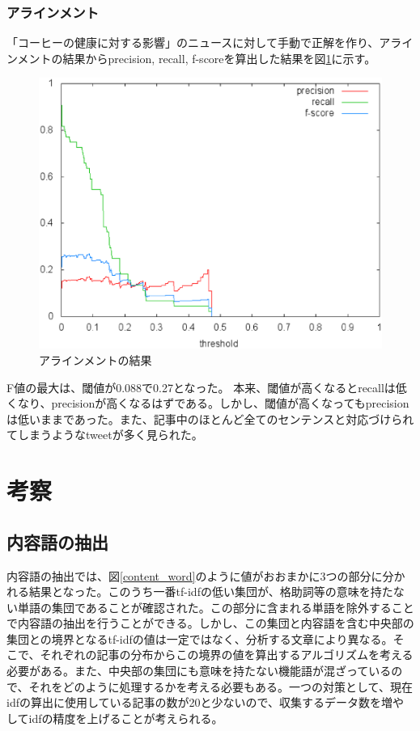 \documentclass[12pt]{jarticle}
\begin{document}
\subsubsection{アラインメント}
「コーヒーの健康に対する影響」のニュースに対して手動で正解を作り、アラインメントの結果からprecision, recall, f-scoreを算出した結果を図\ref{fig3}に示す。
\begin{figure}[htbp]
  \begin{center}
    \includegraphics[scale=0.5]{image/score.eps}
  \end{center}
  \caption{アラインメントの結果}
  \label{fig3}
\end{figure}

F値の最大は、閾値が0.088で0.27となった。
本来、閾値が高くなるとrecallは低くなり、precisionが高くなるはずである。しかし、閾値が高くなってもprecisionは低いままであった。また、記事中のほとんど全てのセンテンスと対応づけられてしまうようなtweetが多く見られた。

\section{考察}
\subsection{内容語の抽出}
内容語の抽出では、図\ref{content_word}のように値がおおまかに3つの部分に分かれる結果となった。このうち一番tf-idfの低い集団が、格助詞等の意味を持たない単語の集団であることが確認された。この部分に含まれる単語を除外することで内容語の抽出を行うことができる。しかし、この集団と内容語を含む中央部の集団との境界となるtf-idfの値は一定ではなく、分析する文章により異なる。そこで、それぞれの記事の分布からこの境界の値を算出するアルゴリズムを考える必要がある。また、中央部の集団にも意味を持たない機能語が混ざっているので、それをどのように処理するかを考える必要もある。一つの対策として、現在idfの算出に使用している記事の数が20と少ないので、収集するデータ数を増やしてidfの精度を上げることが考えられる。
\end{document}
